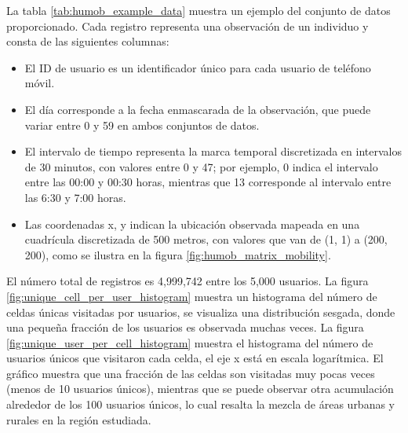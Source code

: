 La tabla \ref{tab:humob_example_data} muestra un ejemplo del conjunto de datos proporcionado. Cada registro representa una observación de un individuo y consta de las siguientes columnas:

\begin{itemize}
    \item El ID de usuario es un identificador único para cada usuario de teléfono móvil.
    \item El día corresponde a la fecha enmascarada de la observación, que puede variar entre 0 y 59 en ambos conjuntos de datos.
    \item El intervalo de tiempo representa la marca temporal discretizada en intervalos de 30 minutos, con valores entre 0 y 47; por ejemplo, 0 indica el intervalo entre las 00:00 y 00:30 horas, mientras que 13 corresponde al intervalo entre las 6:30 y 7:00 horas.
    \item Las coordenadas x, y indican la ubicación observada mapeada en una cuadrícula discretizada de 500 metros, con valores que van de (1, 1) a (200, 200), como se ilustra en la figura \ref{fig:humob_matrix_mobility}.
\end{itemize}

El número total de registros es 4,999,742 entre los 5,000 usuarios. La figura \ref{fig:unique_cell_per_user_histogram} muestra un histograma del número de celdas únicas visitadas por usuarios, se visualiza una distribución sesgada, donde una pequeña fracción de los usuarios es observada muchas veces. La figura \ref{fig:unique_user_per_cell_histogram} muestra el histograma del número de usuarios únicos que visitaron cada celda, el eje x está en escala logarítmica. El gráfico muestra que una fracción de las celdas son visitadas muy pocas veces (menos de 10 usuarios únicos), mientras que se puede observar otra acumulación alrededor de los 100 usuarios únicos, lo cual resalta la mezcla de áreas urbanas y rurales en la región estudiada.

